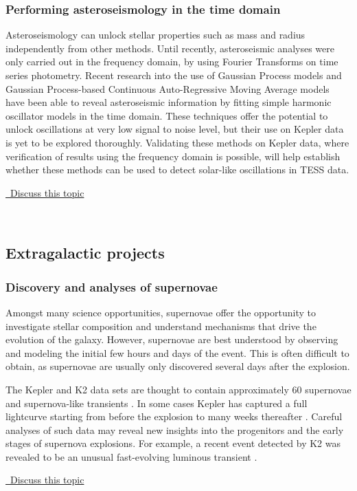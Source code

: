 \documentclass[modern]{aastex62}
\newcommand{\commentlink}[1]{\href{https://github.com/KeplerGO/ScientificOpportunities/issues/#1}{\sc \faExternalLink\ Discuss this topic}\,\,}
\begin{document}
\subsubsection{Performing asteroseismology in the time domain}
Asteroseismology can unlock stellar properties such as mass and radius independently from other methods. Until recently, asteroseismic analyses were only carried out in the frequency domain, by using Fourier Transforms on time series photometry. Recent research into the use of Gaussian Process models \citep{george,foreman-mackey2017} and Gaussian Process-based Continuous Auto-Regressive Moving Average models \citep[CARMA;][]{farr2018} have been able to reveal asteroseismic information by fitting simple harmonic oscillator models in the time domain. These techniques offer the potential to unlock oscillations at very low signal to noise level, but their use on Kepler data is yet to be explored thoroughly. Validating these methods on Kepler data, where verification of results using the frequency domain is possible, will help establish whether these methods can be used to detect solar-like oscillations in TESS data.\\
\begin{center}
\commentlink{17}
\end{center}
\ \\

\subsection{Extragalactic projects}

\subsubsection{Discovery and analyses of supernovae}
Amongst many science opportunities, supernovae offer the opportunity to investigate stellar composition and understand mechanisms that drive the evolution of the galaxy. However, supernovae are best understood by observing and modeling the initial few hours and days of the event. This is often difficult to obtain, as supernovae are usually only discovered several days after the explosion.

The Kepler and K2 data sets are thought to contain approximately 60 supernovae and supernova-like transients \citep[e.g.][]{narayan2018,snrest2018,snsmith2018}.  In some cases Kepler has captured a full lightcurve starting from before the explosion to many weeks thereafter \citep[e.g.][]{garnavich2016}. Careful analyses of such data may reveal new insights into the progenitors and the early stages of supernova explosions. For example, a recent event detected by K2 was revealed to be an unusual fast-evolving luminous transient \citep{rest2018}.
\\
\begin{center}
\commentlink{18}
\end{center}
\ \\
\end{document}
